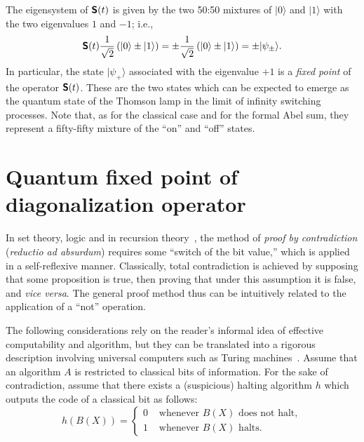 \documentclass{llncs}
\begin{document}
The eigensystem of $\textsf{\textbf{S}}(t)$ is given by the two 50:50 mixtures of $\vert 0\rangle $ and $\vert 1\rangle $
with the two eigenvalues $1$ and $-1$; i.e.,
\begin{equation}
\textsf{\textbf{S}}(t)\frac{1}{\sqrt{2}}\left( \vert 0\rangle \pm \vert 1\rangle   \right)
= \pm \frac{1}{\sqrt{2}}\left( \vert 0\rangle \pm \vert 1\rangle   \right) = \pm \vert \psi_\pm \rangle.
\end{equation}
In particular,  the state   $\vert \psi_+ \rangle$ associated with the eigenvalue $+1$
is a {\em fixed point} of the operator $\textsf{\textbf{S}}(t)$.
These are the two states which can be expected to emerge as the quantum state of the Thomson lamp
in the limit of infinity switching processes.
Note that, as for the classical case and for the formal Abel sum, they represent a fifty-fifty mixture of the ``on'' and ``off'' states.


\section{Quantum fixed point of diagonalization operator}

In set theory, logic and in recursion theory~\cite{rogers1,davis,Barwise-handbook-logic,enderton72,odi:89,Boolos-07},
the method of {\em proof by contradiction} ({\it reductio ad absurdum}) requires some  ``switch of the bit value,'' which is applied in a self-reflexive manner.
Classically, total contradiction is achieved by supposing that some proposition is true,
then proving that under this assumption it is false, and {\it vice versa}.
The general proof method thus can be intuitively related to the application of a ``not'' operation.

The following considerations rely on the reader's informal idea of effective computability
and algorithm, but
they can be translated into a rigorous description involving universal computers such as
Turing machines~\cite[Chapter~C.1]{Barwise-handbook-logic}.
Assume that an algorithm $A$ is
restricted to classical bits of information.
For the sake of contradiction,
assume that there exists a (suspicious) halting algorithm $ h $ which outputs the code of a classical bit as follows:
\begin{equation}
 h  ( B(X) ) =     \left\{
\begin{array}{ll}
0 &\textrm{ whenever $B(X)$ does not halt},  \\
1 &\textrm{  whenever $B(X)$ halts}.
\end{array}
\right.
\label{el:halt}
\end{equation}
\end{document}
